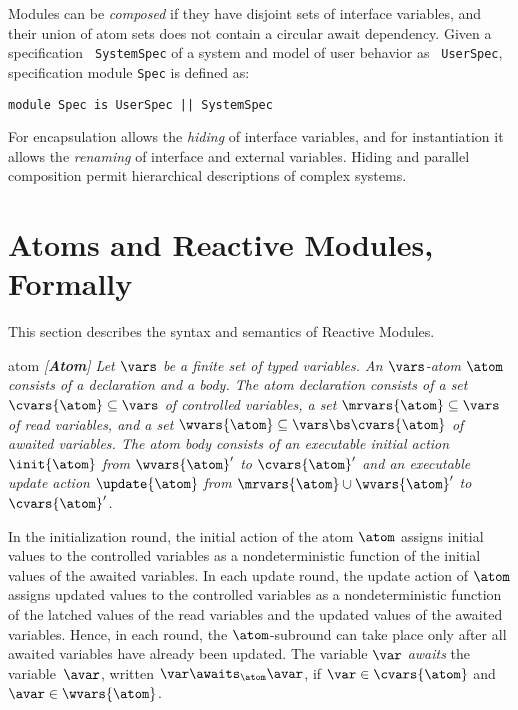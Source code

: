 Modules can be \emph{composed} if they have disjoint sets of
interface variables, and their union of atom sets does not contain
a circular await dependency. Given a specification {\tt
SystemSpec} of a system and model of user behavior as {\tt
UserSpec}, specification module {\tt Spec} is defined as:
\vspace*{-2ex}
\begin{footnotesize}
\begin{verbatim}
module Spec is UserSpec || SystemSpec
\end{verbatim}
\end{footnotesize}
\vspace*{-2ex} For encapsulation \rem{} allows the {\em hiding} of
interface variables, and for instantiation it allows the {\em
renaming} of interface and external variables. Hiding and parallel
composition permit hierarchical descriptions of complex systems.

\section{Atoms and Reactive Modules, Formally}
This section describes the syntax and semantics of Reactive
Modules.

\begin{defi}{atom}\it
  {\em [{\bf Atom}]}
  Let $\vars$ be a finite set of typed variables.
  An {\em $\vars$-atom\/} $\atom$ consists of a declaration and a body.
  The atom declaration consists of a set $\cvars{\atom}\subseteq\vars$ of
  {\em controlled variables}, a set $\mrvars{\atom}\subseteq\vars$ of
  {\em read variables}, and a set
  $\wvars{\atom}\subseteq\vars\bs\cvars{\atom}$ of {\em awaited variables}.
  The atom body consists of an executable {\em initial action\/}
  $\init{\atom}$ from $\wvars{\atom}'$ to $\cvars{\atom}'$ and an executable
  {\em update action\/} $\update{\atom}$ from
  $\mrvars{\atom}\cup\wvars{\atom}'$ to~$\cvars{\atom}'$.
\end{defi}

\mypar In the initialization round, the initial action of the atom
$\atom$ assigns initial values to the controlled variables as a
nondeterministic function of the initial values of the awaited
variables. In each update round, the update action of $\atom$
assigns updated values to the controlled variables as a
nondeterministic function of the latched values of the read
variables and the updated values of the awaited variables. Hence,
in each round, the $\atom$-subround can take place only after all
awaited variables have already been updated. The variable $\var$
{\em awaits\/} the variable~$\avar$, written
$\var\awaits_\atom\avar$, if $\var\in\cvars{\atom}$ and
$\avar\in\wvars{\atom}$.

